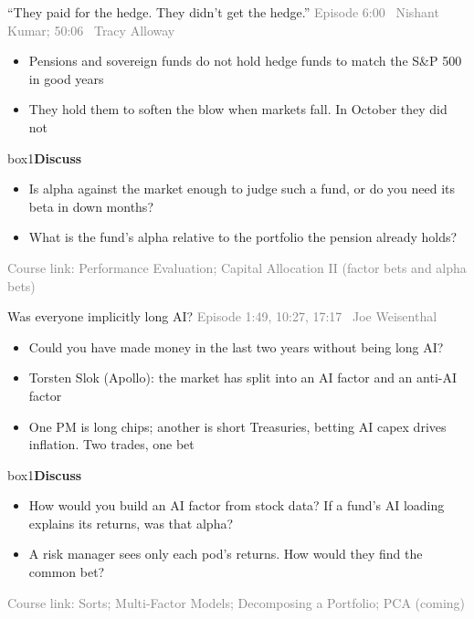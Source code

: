 \documentclass[aspectratio=169,10pt]{beamer}
\newcommand{\src}[1]{{\footnotesize\textcolor{gray}{Episode #1}}\par\vskip 6pt}
\newcommand{\course}[1]{{\footnotesize\textcolor{gray}{Course link: #1}}}
\newenvironment{discuss}{\begin{beamercolorbox}[rounded=true,sep=8pt]{box1}\textbf{Discuss}\par\vskip 3pt}{\end{beamercolorbox}}
\begin{document}
\begin{frame}[label=q2]{``They paid for the hedge. They didn't get the hedge.''}
\src{6:00 \textbullet\ Nishant Kumar; 50:06 \textbullet\ Tracy Alloway}
\begin{itemize}
\item Pensions and sovereign funds do not hold hedge funds to match the S\&P 500 in good years
\vskip 6pt
\item They hold them to soften the blow when markets fall. In October they did not
\end{itemize}
\vskip 12pt
\begin{discuss}
\begin{itemize}
\item Is alpha against the market enough to judge such a fund, or do you need its beta in down months?
\item What is the fund's alpha relative to the portfolio the pension already holds?
\end{itemize}
\end{discuss}
\vfill
\course{Performance Evaluation; Capital Allocation II (factor bets and alpha bets)}
\end{frame}

\begin{frame}[label=q3]{Was everyone implicitly long AI?}
\src{1:49, 10:27, 17:17 \textbullet\ Joe Weisenthal}
\begin{itemize}
\item Could you have made money in the last two years without being long AI?
\vskip 6pt
\item Torsten Slok (Apollo): the market has split into an AI factor and an anti-AI factor
\vskip 6pt
\item One PM is long chips; another is short Treasuries, betting AI capex drives inflation. Two trades, one bet
\end{itemize}
\vskip 10pt
\begin{discuss}
\begin{itemize}
\item How would you build an AI factor from stock data? If a fund's AI loading explains its returns, was that alpha?
\item A risk manager sees only each pod's returns. How would they find the common bet?
\end{itemize}
\end{discuss}
\vfill
\course{Sorts; Multi-Factor Models; Decomposing a Portfolio; PCA (coming)}
\end{frame}
\end{document}
